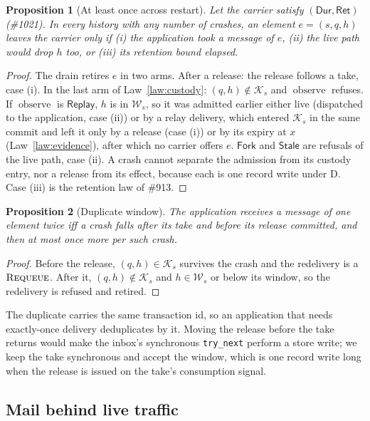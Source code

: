 \documentclass[journal]{IEEEtran}
\newtheorem{proposition}{Proposition}
\newcommand{\obs}{\operatorname{observe}}
\newcommand{\Durable}{\mathsf{Dur}}
\newcommand{\Retained}{\mathsf{Ret}}
\newcommand{\Requeue}{\textsc{Requeue}}
\newcommand{\K}{\mathcal{K}}
\newcommand{\W}{\mathcal{W}}
\newcommand{\issue}[1]{\#{#1}}
\begin{document}
\begin{proposition}[At least once across restart]\label{prop:atleastonce}
Let the carrier satisfy $(\Durable,\Retained)$ (\issue{1021}).  In every history with any
number of crashes, an element $e=(s,q,h)$ leaves the carrier only if (i) the application
took a message of $e$, (ii) the live path would drop $h$ too, or (iii) its retention bound
elapsed.
\end{proposition}
\begin{proof}
The drain retires $e$ in two arms.  After a release: the release follows a take, case (i).
In the last arm of Law~\ref{law:custody}: $(q,h)\notin\K_s$ and $\obs$ refuses.  If $\obs$
is $\mathsf{Replay}$, $h$ is in $\W_s$, so it was admitted earlier either live (dispatched
to the application, case (ii)) or by a relay delivery, which entered $\K_s$ in the same
commit and left it only by a release (case (i)) or by its expiry at $x$
(Law~\ref{law:evidence}), after which no carrier offers $e$.  $\mathsf{Fork}$ and $\mathsf{Stale}$ are refusals of the live path,
case (ii).  A crash cannot separate the admission from its custody entry, nor a release
from its effect, because each is one record write under D.  Case (iii) is the retention
law of \#913.
\end{proof}

\begin{proposition}[Duplicate window]\label{prop:dup}
The application receives a message of one element twice iff a crash falls after its take
and before its release committed, and then at most once more per such crash.
\end{proposition}
\begin{proof}
Before the release, $(q,h)\in\K_s$ survives the crash and the redelivery is a
$\Requeue$.  After it, $(q,h)\notin\K_s$ and $h\in\W_s$ or below its window, so the
redelivery is refused and retired.
\end{proof}

The duplicate carries the same transaction id, so an application that needs exactly-once
delivery deduplicates by it.  Moving the release before the take returns would make the
inbox's synchronous \texttt{try\_next} perform a store write; we keep the take synchronous
and accept the window, which is one record write long when the release is issued on the
take's consumption signal.

\subsection{Mail behind live traffic}
\end{document}
